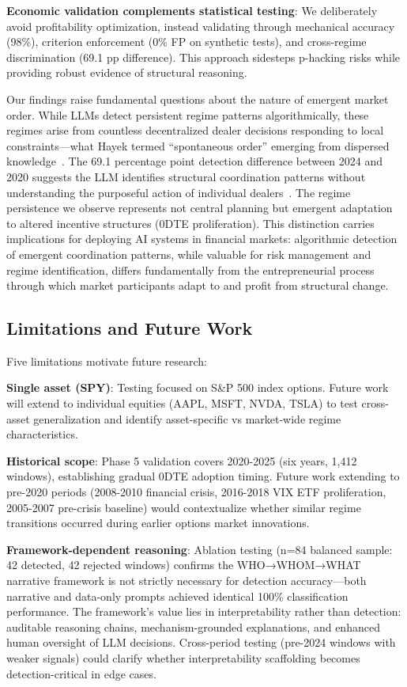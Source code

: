 \textbf{Economic validation complements statistical testing}: We deliberately avoid profitability optimization, instead validating through mechanical accuracy (98\%), criterion enforcement (0\% FP on synthetic tests), and cross-regime discrimination (69.1 pp difference). This approach sidesteps p-hacking risks while providing robust evidence of structural reasoning.

Our findings raise fundamental questions about the nature of emergent market order. While LLMs detect persistent regime patterns algorithmically, these regimes arise from countless decentralized dealer decisions responding to local constraints—what Hayek termed ``spontaneous order'' emerging from dispersed knowledge~\cite{hayek1945}. The 69.1 percentage point detection difference between 2024 and 2020 suggests the LLM identifies structural coordination patterns without understanding the purposeful action of individual dealers~\cite{mises1949,rothbard1962}. The regime persistence we observe represents not central planning but emergent adaptation to altered incentive structures (0DTE proliferation). This distinction carries implications for deploying AI systems in financial markets: algorithmic detection of emergent coordination patterns, while valuable for risk management and regime identification, differs fundamentally from the entrepreneurial process through which market participants adapt to and profit from structural change.

\subsection{Limitations and Future Work}

Five limitations motivate future research:

\textbf{Single asset (SPY)}: Testing focused on S\&P 500 index options. Future work will extend to individual equities (AAPL, MSFT, NVDA, TSLA) to test cross-asset generalization and identify asset-specific vs market-wide regime characteristics.

\textbf{Historical scope}: Phase 5 validation covers 2020-2025 (six years, 1,412 windows), establishing gradual 0DTE adoption timing. Future work extending to pre-2020 periods (2008-2010 financial crisis, 2016-2018 VIX ETF proliferation, 2005-2007 pre-crisis baseline) would contextualize whether similar regime transitions occurred during earlier options market innovations.

\textbf{Framework-dependent reasoning}: Ablation testing (n=84 balanced sample: 42 detected, 42 rejected windows) confirms the WHO→WHOM→WHAT narrative framework is not strictly necessary for detection accuracy—both narrative and data-only prompts achieved identical 100\% classification performance. The framework's value lies in interpretability rather than detection: auditable reasoning chains, mechanism-grounded explanations, and enhanced human oversight of LLM decisions. Cross-period testing (pre-2024 windows with weaker signals) could clarify whether interpretability scaffolding becomes detection-critical in edge cases.

